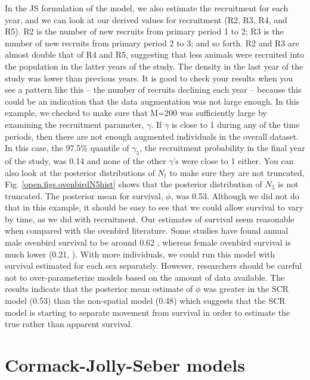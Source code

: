 In the JS formulation of the model, we also estimate the recruitment
for each year, and we can look at our derived values for recruitment
(R2, R3, R4, and R5).  R2 is the number of new recruits from primary
period 1 to 2; R3 is the number of new recruits from primary period 2
to 3; and so forth.  R2 and R3 are almost double that of R4 and R5,
suggesting that less animals were recruited into the population in the
latter years of the study.  The density in the last year of the study
was lower than previous years.  It is good to check your results when
you see a pattern like this -- the number of recruits declining each
year -- because this could be an indication that the data augmentation
was not large enough.  In this example, we checked to make sure that
M=200 was sufficiently large by examining the recruitment parameter,
$\gamma$.  If $\gamma$ is close to 1 during any of the time periods,
then there are not enough augmented individuals in the overall
dataset.  In this case, the 97.5\% quantile of $\gamma_5$, the
recruitment probability in the final year of the study, was 0.14 and
none of the other $\gamma$'s were close to 1 either.  You can also look
at the posterior distributions of $N_t$ to make sure they are not
truncated, Fig. \ref{open.figs.ovenbirdN5hist} shows that the
posterior distribution of $N_5$ is not truncated. The posterior mean
for survival, $\phi$, was 0.53.  Although we did not do that in this example, it
should be easy to see that we could allow survival to vary by time, as
we did with recruitment.  Our estimates of survival seem reasonable
when compared with the ovenbird literature.  Some studies have found annual
male ovenbird survival to be around 0.62
\citep{porneluzi_faaborg:1999, bayne_hobson:2002}, whereas female
ovenbird survival is much lower (0.21,
\cite{bayne_hobson:2002}). With more individuals, we could run this
model with survival estimated for each sex separately.  However,
researchers should be careful not to over-parameterize models based on
the amount of data available.  The results indicate that the posterior
mean estimate of $\phi$ was greater in the SCR model (0.53) than the
non-spatial model (0.48) which suggests that the SCR model is starting
to separate movement from survival in order to estimate the true rather than apparent
survival.



\section{Cormack-Jolly-Seber models}
\label{open.sec.cjs}

